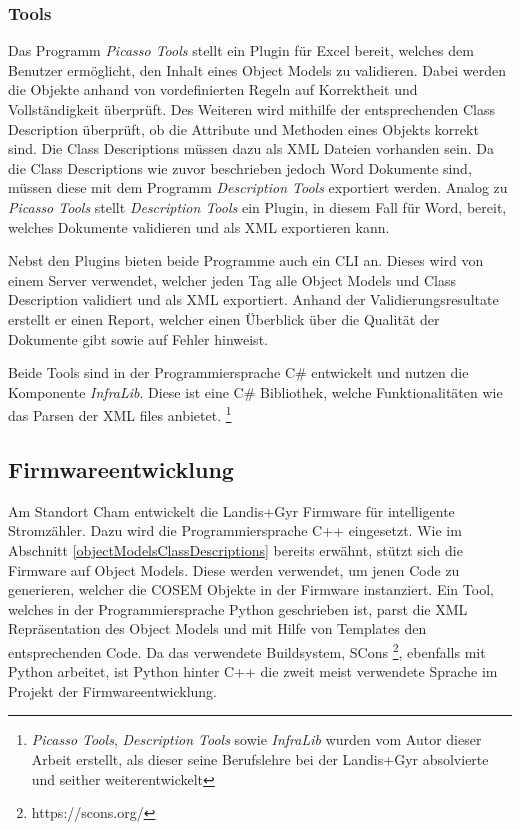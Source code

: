 \subsubsection{Tools}
Das Programm \textit{Picasso Tools} stellt ein Plugin für Excel bereit, welches dem Benutzer ermöglicht, den Inhalt eines Object Models zu validieren.
Dabei werden die Objekte anhand von vordefinierten Regeln auf Korrektheit und Vollständigkeit überprüft.
Des Weiteren wird mithilfe der entsprechenden Class Description überprüft, ob die Attribute und Methoden eines Objekts korrekt sind.
Die Class Descriptions müssen dazu als XML Dateien vorhanden sein.
Da die Class Descriptions wie zuvor beschrieben jedoch Word Dokumente sind, müssen diese mit dem Programm \textit{Description Tools} exportiert werden.
Analog zu \textit{Picasso Tools} stellt \textit{Description Tools} ein Plugin, in diesem Fall für Word, bereit, welches Dokumente validieren und als XML exportieren kann.

Nebst den Plugins bieten beide Programme auch ein \ac{CLI} an.
Dieses wird von einem Server verwendet, welcher jeden Tag alle Object Models und Class Description validiert und als XML exportiert.
Anhand der Validierungsresultate erstellt er einen Report, welcher einen Überblick über die Qualität der Dokumente gibt sowie auf Fehler hinweist.

Beide Tools sind in der Programmiersprache C\# entwickelt und nutzen die Komponente \textit{InfraLib}.
Diese ist eine C\# Bibliothek, welche Funktionalitäten wie das Parsen der XML files anbietet. 
\footnote{\textit{Picasso Tools}, \textit{Description Tools} sowie \textit{InfraLib} wurden vom Autor dieser Arbeit erstellt, als dieser seine Berufslehre bei der Landis+Gyr absolvierte und seither weiterentwickelt }

\subsection{Firmwareentwicklung}\label{fwEntwicklung}
Am Standort Cham entwickelt die Landis+Gyr Firmware für intelligente Stromzähler.
Dazu wird die Programmiersprache C++ eingesetzt.
Wie im Abschnitt \ref{objectModelsClassDescriptions} bereits erwähnt, stützt sich die Firmware auf Object Models.
Diese werden verwendet, um jenen Code zu generieren, welcher die \ac{COSEM} Objekte in der Firmware instanziert.
Ein Tool, welches in der Programmiersprache Python geschrieben ist, parst die XML Repräsentation des Object Models und mit Hilfe von Templates den entsprechenden Code.
Da das verwendete Buildsystem, SCons \footnote{https://scons.org/}, ebenfalls mit Python arbeitet, ist Python hinter C++ die zweit meist verwendete Sprache im Projekt der Firmwareentwicklung.

